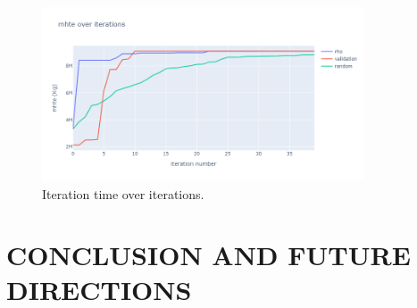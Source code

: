 \documentclass[smallextended,natbib]{svjour3}       %
\numberwithin{theorem}{section}
\begin{document}
\begin{figure}[H]
  \centering
  \includegraphics[width=0.85\textwidth]{images/mhte.png}%
  \caption{Iteration time over iterations.}
  \label{fig:iter_time_over_iter}
\end{figure}












\section{CONCLUSION AND FUTURE DIRECTIONS}
\end{document}
